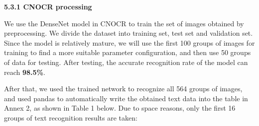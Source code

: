\documentclass{apmcmthesis}
\begin{document}
	\noindent\textbf{5.3.1 CNOCR processing}
		
	We use the DenseNet model in CNOCR to train the set of images obtained by preprocessing. We divide the dataset into training set, test set and validation set. Since the model is relatively mature, we will use the first 100 groups of images for training to find a more suitable parameter configuration, and then use 50 groups of data for testing. After testing, the accurate recognition rate of the model can reach \textbf{98.5\%}.

	After that, we used the trained network to recognize all 564 groups of images, and used pandas to automatically write the obtained text data into the table in Annex 2, as shown in Table 1 below. Due to space reasons, only the first 16 groups of text recognition results are taken:
	
	
	
\end{document}
